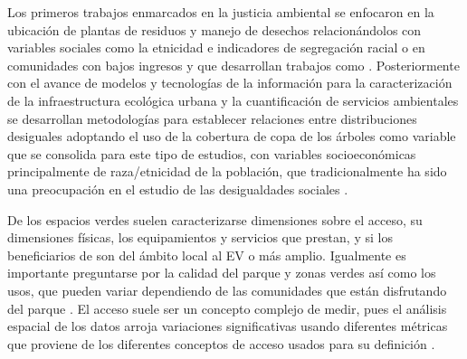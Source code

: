 \documentclass[12pt,]{book}
\begin{document}
Los primeros trabajos enmarcados en la justicia ambiental se enfocaron
en la ubicación de plantas de residuos y manejo de desechos
relacionándolos con variables sociales como la etnicidad e indicadores
de segregación racial o en comunidades con bajos ingresos
\citep{heynen_political_2006} y que desarrollan trabajos como
\citep{chakraborty1997exploring, cutter_role_1996}. Posteriormente con
el avance de modelos y tecnologías de la información para la
caracterización de la infraestructura ecológica urbana y la
cuantificación de servicios ambientales se desarrollan metodologías para
establecer relaciones entre distribuciones desiguales adoptando el uso
de la cobertura de copa de los árboles como variable que se consolida
para este tipo de estudios, con variables socioeconómicas principalmente
de raza/etnicidad de la población, que tradicionalmente ha sido una
preocupación en el estudio de las desigualdades sociales
\citep{heynen_political_2006, landry_street_2009, phelps_association_2012, zhou_social_2013, schwarz_trees_2015, watkins_is_2016}.

De los espacios verdes suelen caracterizarse dimensiones sobre el
acceso, su dimensiones físicas, los equipamientos y servicios que
prestan, y si los beneficiarios de son del ámbito local al EV o más
amplio. Igualmente es importante preguntarse por la calidad del parque y
zonas verdes así como los usos, que pueden variar dependiendo de las
comunidades que están disfrutando del parque \citep{kabisch_green_2014}.
El acceso suele ser un concepto complejo de medir, pues el análisis
espacial de los datos arroja variaciones significativas usando
diferentes métricas que proviene de los diferentes conceptos de acceso
usados para su definición \citep{talen_assessing_1998}.
\end{document}
